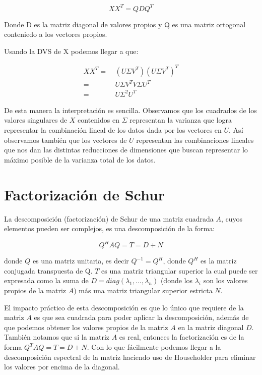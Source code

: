 \documentclass[12pt]{article}
\begin{document}
$$XX^T = QDQ^T$$

Donde D es la matriz diagonal de valores propios y Q es una matriz ortogonal conteniedo a los vectores propios.

Usando la DVS de X podemos llegar a que:

\begin{align*}
XX^T = & \ (U\Sigma V^T)(U \Sigma V^T)^T\\
= & \ U \Sigma V^T V \Sigma U^T\\
= & \ U \Sigma^2 U^T
\end{align*}

De esta manera la interpretación es sencilla. Observamos que los cuadrados de los valores singulares de $X$ contenidos en $\Sigma$ representan la varianza que logra representar la combinación lineal de los datos dada por los vectores en $U$. Así observamos también que los vectores de $U$ representan las combinaciones lineales que nos dan las distintas reducciones de dimensiones que buscan representar lo máximo posible de la varianza total de los datos.



\section{Factorización de Schur}

La descomposición (factorización) de Schur de una matriz cuadrada $A$, cuyos elementos pueden ser complejos, es una descomposición de la forma:

$$Q^HAQ=T=D+N$$

donde $Q$ es una matriz unitaria, es decir $Q^{-1}=Q^H$, donde $Q^H$ es la matriz conjugada transpuesta de Q. $T$ es una matriz triangular superior la cual puede ser expresada como la suma de $D=diag(\lambda_1, ..., \lambda_n)$ (donde los $\lambda_i$ son los valores propios de la matriz $A$) más una matriz triangular superior estricta $N$.

El impacto práctico de esta descomposición es que lo único que requiere de la matriz $A$ es que sea cuadrada para poder aplicar la descomposición, además de que podemos obtener los valores propios de la matriz $A$ en la matriz diagonal $D$. También notamos que si la matriz $A$ es real, entonces la factorización es de la forma $Q^TAQ = T = D + N$. Con lo que fácilmente podemos llegar a la descomposición espectral de la matriz haciendo uso de Householder para eliminar los valores por encima de la diagonal.
\end{document}
